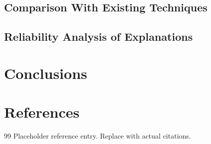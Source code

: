 \documentclass[lettersize,journal]{IEEEtran}
\begin{document}
\subsection{Comparison With Existing Techniques}

\subsection{Reliability Analysis of Explanations}

\section{Conclusions}

\section*{References}
\begin{thebibliography}{99}
 Placeholder reference entry. Replace with actual citations.
\end{thebibliography}
\end{document}
